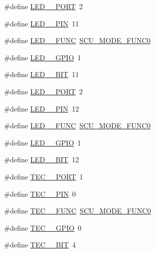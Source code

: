\begin{DoxyCompactItemize}
\item 
\#define \hyperlink{group__samples_ga41f8586c0d98e483bba52f73e1a183b2}{L\+E\+D\+\_\+\_\+\+P\+O\+RT}~2
\item 
\#define \hyperlink{group__samples_ga78579f743b58c20ec8d10120d8381148}{L\+E\+D\+\_\+\_\+\+P\+IN}~11
\item 
\#define \hyperlink{group__samples_gaf7a6713ffe71577e7b394f5456b6dcea}{L\+E\+D\+\_\+\_\+\+F\+U\+NC}~\hyperlink{group___s_c_u__18_x_x__43_x_x_gaec79b551b98008d8986e719926f254bc}{S\+C\+U\+\_\+\+M\+O\+D\+E\+\_\+\+F\+U\+N\+C0}
\item 
\#define \hyperlink{group__samples_ga4285bdd58098064c3bab3976a78b26fa}{L\+E\+D\+\_\+\_\+\+G\+P\+IO}~1
\item 
\#define \hyperlink{group__samples_gaef7b45a64de5055d117ed11ec76ee9f5}{L\+E\+D\+\_\+\_\+\+B\+IT}~11
\item 
\#define \hyperlink{group__samples_gaaa65a4a427142f3ecdc5f1fe415d190c}{L\+E\+D\+\_\+\_\+\+P\+O\+RT}~2
\item 
\#define \hyperlink{group__samples_ga5ea98da36d05b171b54c342bcf4a35f7}{L\+E\+D\+\_\+\_\+\+P\+IN}~12
\item 
\#define \hyperlink{group__samples_gab0622590a012697e9e5d95cff50cad26}{L\+E\+D\+\_\+\_\+\+F\+U\+NC}~\hyperlink{group___s_c_u__18_x_x__43_x_x_gaec79b551b98008d8986e719926f254bc}{S\+C\+U\+\_\+\+M\+O\+D\+E\+\_\+\+F\+U\+N\+C0}
\item 
\#define \hyperlink{group__samples_gadd2d323f8eb544f1ab84762f94e44bd4}{L\+E\+D\+\_\+\_\+\+G\+P\+IO}~1
\item 
\#define \hyperlink{group__samples_gab9b4d582a53ac2329ac4b7527561fa80}{L\+E\+D\+\_\+\_\+\+B\+IT}~12
\item 
\#define \hyperlink{group__samples_ga8646ae3b4a7ad2be7610ff81e3d73c0f}{T\+E\+C\+\_\+\_\+\+P\+O\+RT}~1
\item 
\#define \hyperlink{group__samples_gabbb083565fd13306450dfc5fdcf934c0}{T\+E\+C\+\_\+\_\+\+P\+IN}~0
\item 
\#define \hyperlink{group__samples_ga8ae57a649603bf7f33d0e896b034bd41}{T\+E\+C\+\_\+\_\+\+F\+U\+NC}~\hyperlink{group___s_c_u__18_x_x__43_x_x_gaec79b551b98008d8986e719926f254bc}{S\+C\+U\+\_\+\+M\+O\+D\+E\+\_\+\+F\+U\+N\+C0}
\item 
\#define \hyperlink{group__samples_ga8731b2048404c4c819291bebfc6a1e6a}{T\+E\+C\+\_\+\_\+\+G\+P\+IO}~0
\item 
\#define \hyperlink{group__samples_ga0f27cf5eeffd9d5f04a6a4c57bbdbae7}{T\+E\+C\+\_\+\_\+\+B\+IT}~4

\end{DoxyCompactItemize}
